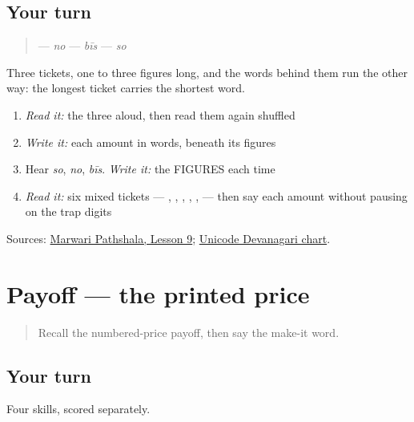 \subsection*{Your turn}
\begin{quote}
\textbf{} — \emph{no}  \textbf{} — \emph{bīs}  \textbf{} — \emph{so}
\end{quote}

Three tickets, one to three figures long, and the words behind them run the other way: the longest ticket carries the shortest word.

\begin{enumerate}
\raggedright
  \item \emph{Read it:} the three aloud, then read them again shuffled
  \item \emph{Write it:} each amount in words, beneath its figures
  \item Hear \emph{so}, \emph{no}, \emph{bīs}. \emph{Write it:} the FIGURES each time
  \item \emph{Read it:} six mixed tickets — \textbf{}, \textbf{}, \textbf{}, \textbf{}, \textbf{}, \textbf{} — then say each amount without pausing on the trap digits
\end{enumerate}

\begin{tcolorbox}[breakable,colback=teal!4,colframe=teal!35!black,title={Before you move on}]
Sources: \href{https://www.marwaripathshala.com/marwari-lesson-9-english}{Marwari Pathshala, Lesson 9}; \href{https://www.unicode.org/charts/PDF/U0900.pdf}{Unicode Devanagari chart}.
\end{tcolorbox}
\section[Practice]{Payoff — the printed price}

\label{lesson:MW-C35-ticket-four}



\begin{quote}
Recall the numbered-price payoff, then say the make-it word.
\end{quote}

\subsection*{Your turn}
Four skills, scored separately.

